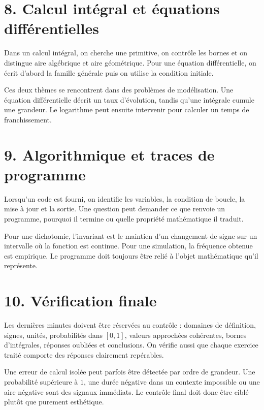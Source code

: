 
\section{8. Calcul intégral et équations différentielles}
Dans un calcul intégral, on cherche une primitive, on contrôle les bornes et on distingue aire algébrique et aire géométrique. Pour une équation différentielle, on écrit d’abord la famille générale puis on utilise la condition initiale.

Ces deux thèmes se rencontrent dans des problèmes de modélisation. Une équation différentielle décrit un taux d’évolution, tandis qu’une intégrale cumule une grandeur. Le logarithme peut ensuite intervenir pour calculer un temps de franchissement.

\section{9. Algorithmique et traces de programme}
Lorsqu’un code est fourni, on identifie les variables, la condition de boucle, la mise à jour et la sortie. Une question peut demander ce que renvoie un programme, pourquoi il termine ou quelle propriété mathématique il traduit.

Pour une dichotomie, l’invariant est le maintien d’un changement de signe sur un intervalle où la fonction est continue. Pour une simulation, la fréquence obtenue est empirique. Le programme doit toujours être relié à l’objet mathématique qu’il représente.

\section{10. Vérification finale}
Les dernières minutes doivent être réservées au contrôle : domaines de définition, signes, unités, probabilités dans $[0,1]$, valeurs approchées cohérentes, bornes d’intégrales, réponses oubliées et conclusions. On vérifie aussi que chaque exercice traité comporte des réponses clairement repérables.

Une erreur de calcul isolée peut parfois être détectée par ordre de grandeur. Une probabilité supérieure à $1$, une durée négative dans un contexte impossible ou une aire négative sont des signaux immédiats. Le contrôle final doit donc être ciblé plutôt que purement esthétique.

